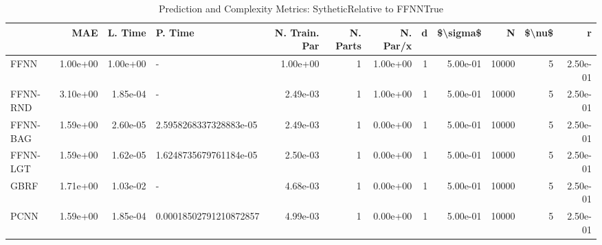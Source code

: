 \begin{table}
\centering
\caption{Prediction and Complexity Metrics: SytheticRelative to FFNNTrue}
\label{tab__Sythetic__Fix_Neurons_QTrue}
\begin{tabular}{lrrlrrrrrrrr}
\toprule
{} &      MAE &  L. Time &                 P. Time &  N. Train. Par &  N. Parts &  N. Par/x &  d &  \$\textbackslash sigma\$ &      N &  \$\textbackslash nu\$ &        r \\
\midrule
FFNN     & 1.00e+00 & 1.00e+00 &                       - &       1.00e+00 &         1 &  1.00e+00 &  1 &  5.00e-01 &  10000 &      5 & 2.50e-01 \\
FFNN-RND & 3.10e+00 & 1.85e-04 &                       - &       2.49e-03 &         1 &  1.00e+00 &  1 &  5.00e-01 &  10000 &      5 & 2.50e-01 \\
FFNN-BAG & 1.59e+00 & 2.60e-05 &  2.5958268337328883e-05 &       2.49e-03 &         1 &  0.00e+00 &  1 &  5.00e-01 &  10000 &      5 & 2.50e-01 \\
FFNN-LGT & 1.59e+00 & 1.62e-05 &  1.6248735679761184e-05 &       2.50e-03 &         1 &  0.00e+00 &  1 &  5.00e-01 &  10000 &      5 & 2.50e-01 \\
GBRF     & 1.71e+00 & 1.03e-02 &                       - &       4.68e-03 &         1 &  0.00e+00 &  1 &  5.00e-01 &  10000 &      5 & 2.50e-01 \\
PCNN     & 1.59e+00 & 1.85e-04 &  0.00018502791210872857 &       4.99e-03 &         1 &  0.00e+00 &  1 &  5.00e-01 &  10000 &      5 & 2.50e-01 \\
\bottomrule
\end{tabular}
\end{table}
